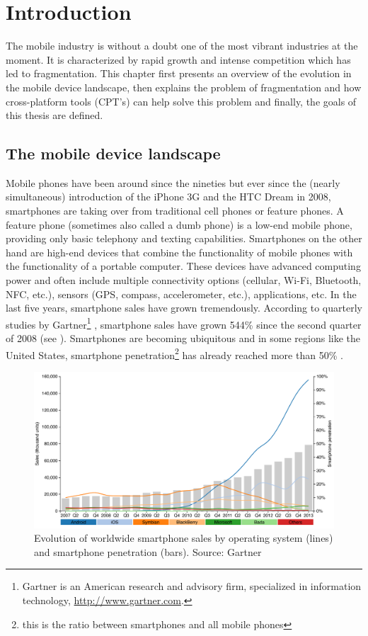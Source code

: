 \chapter{Introduction}
\label{cha:intro}

The mobile industry is without a doubt one of the most vibrant industries at the moment. It is characterized by rapid growth and intense competition which has led to fragmentation. This chapter first presents an overview of the evolution in the mobile device landscape, then explains the problem of fragmentation and how cross-platform tools (CPT's) can help solve this problem and finally, the goals of this thesis are defined.

\section{The mobile device landscape}

Mobile phones have been around since the nineties but ever since the (nearly simultaneous) introduction of the iPhone 3G and the HTC Dream in 2008, smartphones are taking over from traditional cell phones or feature phones. A feature phone (sometimes also called a dumb phone) is a low-end mobile phone, providing only basic telephony and texting capabilities. Smartphones on the other hand are high-end devices that combine the functionality of mobile phones with the functionality of a portable computer. These devices have advanced computing power and often include multiple connectivity options (cellular, Wi-Fi, Bluetooth, NFC, etc.), sensors (GPS, compass, accelerometer, etc.), applications, etc. In the last five years, smartphone sales have grown tremendously. According to quarterly studies by Gartner\footnote{Gartner is an American research and advisory firm, specialized in information technology, \url{http://www.gartner.com}.} \citeGartner, smartphone sales have grown 544\% since the second quarter of 2008 (see ). Smartphones are becoming ubiquitous and in some regions like the United States, smartphone penetration\footnote{this is the ratio between smartphones and all mobile phones} has already reached more than 50\% \cite{Nielsen:2012}. 

\begin{figure}[h]
    \centering
    \includegraphics[width=\textwidth]{../resources/figs/smartphone_sales.pdf}
    	\caption{Evolution of worldwide smartphone sales by operating system (lines) and smartphone penetration (bars). Source: Gartner \citeGartner}
    	\label{fig:smartphone-sales}
\end{figure}

